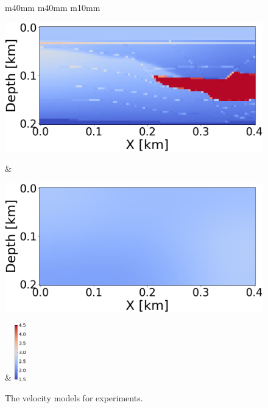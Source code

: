 \begin{figure}[t]
    \centering
    \begin{tabular}{m{40mm} m{40mm} m{10mm}}
        \begin{minipage}[b]{\linewidth}
            \centering
            \includegraphics[width=\linewidth]{public/true}
            \vspace{-9mm}
            \caption*{}
            \vspace{1mm}
        \end{minipage} &
        \hspace{-5mm}
        \begin{minipage}[b]{\linewidth}
            \centering
            \includegraphics[width=\linewidth]{public/initial}
            \vspace{-9mm}
            \caption*{}
            \vspace{1mm}
        \end{minipage} &
        \hspace{-8mm}
        \includegraphics[height=25mm]{public/color-bar}
    \end{tabular}
    \vspace{-4mm}
    \caption{The velocity models for experiments.}
    \vspace{-5mm}
    \label{fig:experiment-data}
\end{figure}
